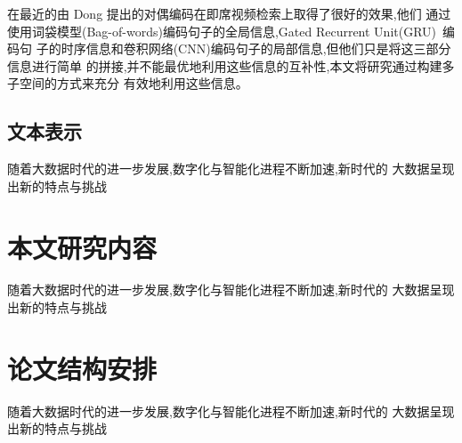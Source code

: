 在最近的由 Dong \etal\cite{dong2019dual}提出的对偶编码在即席视频检索上取得了很好的效果,他们
通过使用词袋模型(Bag-of-words)编码句子的全局信息,Gated Recurrent Unit(GRU)~\cite{cho2014learning}编码句
子的时序信息和卷积网络(CNN)编码句子的局部信息,但他们只是将这三部分信息进行简单
的拼接,并不能最优地利用这些信息的互补性,本文将研究通过构建多子空间的方式来充分
有效地利用这些信息。

\subsection{文本表示}
随着大数据时代的进一步发展,数字化与智能化进程不断加速,新时代的
大数据呈现出新的特点与挑战
\section{本文研究内容}
随着大数据时代的进一步发展,数字化与智能化进程不断加速,新时代的
大数据呈现出新的特点与挑战
\section{论文结构安排}
随着大数据时代的进一步发展,数字化与智能化进程不断加速,新时代的
大数据呈现出新的特点与挑战

